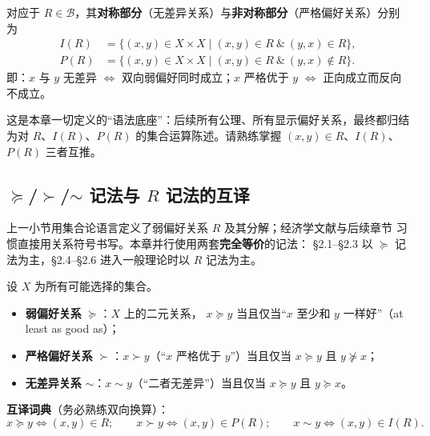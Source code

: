 \begin{definition}[无差异部分与严格偏好部分]
对应于 $R\in\mathcal{B}$，其\textbf{对称部分}（无差异关系）与\textbf{非对称部分}（严格偏好关系）分别为
\begin{align}
I(R) &= \{(x,y)\in X\times X \mid (x,y)\in R \ \&\ (y,x)\in R\}, \label{eq:IR}\\
P(R) &= \{(x,y)\in X\times X \mid (x,y)\in R \ \&\ (y,x)\notin R\}. \label{eq:PR}
\end{align}
即：$x$ 与 $y$ 无差异 $\iff$ 双向弱偏好同时成立；$x$ 严格优于 $y$ $\iff$ 正向成立而反向不成立。
\end{definition}

\begin{remark}
这是本章一切定义的“语法底座”：后续所有公理、所有显示偏好关系，最终都归结为对
$R$、$I(R)$、$P(R)$ 的集合运算陈述。请熟练掌握 $(x,y)\in R$、$I(R)$、$P(R)$ 三者互推。
\end{remark}

\subsection{\texorpdfstring{$\succeq$/$\succ$/$\sim$}{≽/≻/∼} 记法与 $R$ 记法的互译}

上一小节用集合论语言定义了弱偏好关系 $R$ 及其分解；经济学文献与后续章节
习惯直接用关系符号书写。本章并行使用两套\textbf{完全等价}的记法：
§2.1--§2.3 以 $\succeq$ 记法为主，§2.4--§2.6 进入一般理论时以 $R$ 记法为主。

\begin{definition}\label{def:prefsymbols}
设 $X$ 为所有可能选择的集合。
\begin{itemize}
  \item \textbf{弱偏好关系} $\succeq$：$X$ 上的二元关系，
  $x\succeq y$ 当且仅当“$x$ 至少和 $y$ 一样好”（at least as good as）；
  \item \textbf{严格偏好关系} $\succ$：$x\succ y$（“$x$ 严格优于 $y$”）当且仅当
  $x\succeq y$ 且 $y\not\succeq x$；
  \item \textbf{无差异关系} $\sim$：$x\sim y$（“二者无差异”）当且仅当
  $x\succeq y$ 且 $y\succeq x$。
\end{itemize}
\end{definition}

\textbf{互译词典}（务必熟练双向换算）：
\[
x\succeq y \iff (x,y)\in R;\qquad
x\succ y \iff (x,y)\in P(R);\qquad
x\sim y \iff (x,y)\in I(R).
\]


